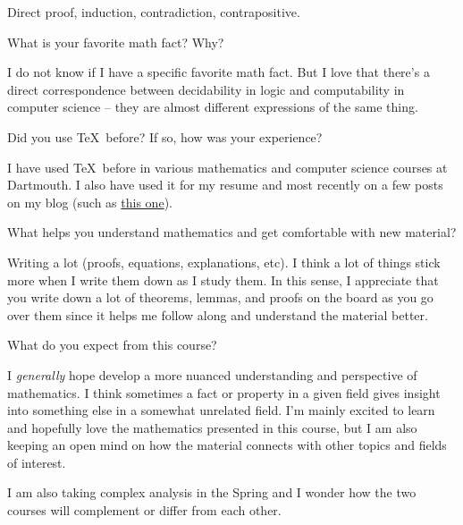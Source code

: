 \documentclass[11pt]{amsart}
\begin{document}
\begin{enumarabic}
    \begin{Answer}
      Direct proof, induction, contradiction, contrapositive.
    \end{Answer}

  \item What is your favorite math fact? Why?
  
    \begin{Answer}
      I do not know if I have a specific favorite math fact.
      But I love that there's a direct correspondence between
      decidability in logic and computability in computer science
      -- they are almost different expressions of the same thing.
    \end{Answer}
  
  \item Did you use \TeX\ before?
    If so, how was your experience?

    \begin{Answer}
      I have used \TeX\ before in various mathematics and computer science courses
      at Dartmouth. I also have used it for my resume
       and most recently on a few posts on my blog
       (such as \href{https://amittai.space/math/2023-02-riemann-zeta-properties}{this one}).
    \end{Answer}

  \item What helps you understand mathematics and get comfortable with new material?
    
    \begin{Answer}
      Writing a lot (proofs, equations, explanations, etc).
      I think a lot of things stick more when I write them down
      as I study them. In this sense, I appreciate that you write down a lot of
      theorems, lemmas, and proofs on the board as you go over them
      since it helps me follow along and understand the material better.
    \end{Answer}
  
  \item What do you expect from this course?
  
    \begin{Answer}
      I \emph{generally} hope develop a more nuanced understanding
      and perspective of mathematics.
      I think sometimes a fact or property in a given field
      gives insight into something else in a somewhat unrelated field.
      I'm mainly excited to learn and hopefully love
      the mathematics presented in this course,
      but I am also keeping an open mind on how the material connects with
      other topics and fields of interest.

      I am also taking complex analysis in the Spring and I
      wonder how the two courses will complement or differ from
      each other.
    \end{Answer}
\end{enumarabic}

\vfill
\end{document}
